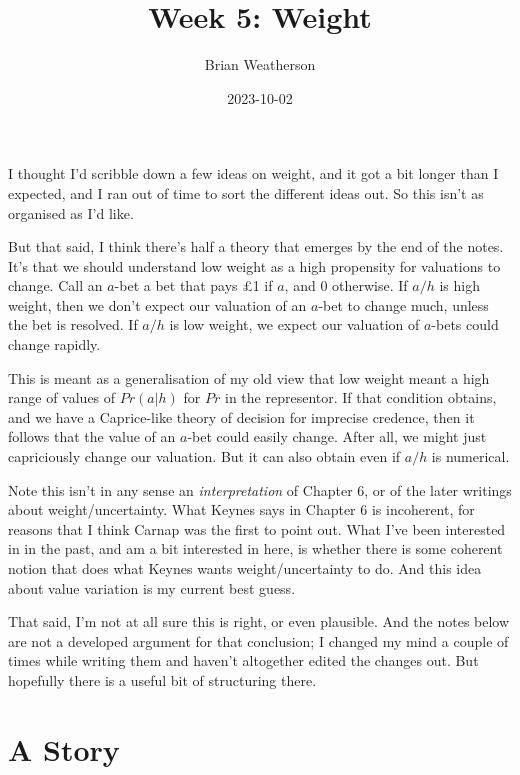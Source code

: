 \documentclass[
  11pt,
  letterpaper,
  DIV=11,
  numbers=noendperiod,
  oneside]{scrartcl}
\title{Week 5: Weight}
\author{Brian Weatherson}
\date{2023-10-02}
\begin{document}
\maketitle
I thought I'd scribble down a few ideas on weight, and it got a bit
longer than I expected, and I ran out of time to sort the different
ideas out. So this isn't as organised as I'd like.

But that said, I think there's half a theory that emerges by the end of
the notes. It's that we should understand low weight as a high
propensity for valuations to change. Call an \(a\)-bet a bet that pays
£1 if \(a\), and 0 otherwise. If \(a/h\) is high weight, then we don't
expect our valuation of an \(a\)-bet to change much, unless the bet is
resolved. If
\(a/h\) is low weight, we expect our valuation of \(a\)-bets could
change rapidly.

This is meant as a generalisation of my old view that low weight meant a
high range of values of \(Pr(a | h)\) for \(Pr\) in the representor. If
that condition obtains, and we have a Caprice-like theory of decision
for imprecise credence, then it follows that the value of an \(a\)-bet
could easily change. After all, we might just capriciously change our
valuation. But it can also obtain even if \(a/h\) is numerical.

Note this isn't in any sense an \emph{interpretation} of Chapter 6, or
of the later writings about weight/uncertainty. What Keynes says in
Chapter 6 is incoherent, for reasons that I think Carnap was the first
to point out. What I've been interested in in the past, and am a bit
interested in here, is whether there is some coherent notion that does
what Keynes wants weight/uncertainty to do. And this idea about value
variation is my current best guess.

That said, I'm not at all sure this is right, or even plausible. And the
notes below are not a developed argument for that conclusion; I changed
my mind a couple of times while writing them and haven't altogether
edited the changes out. But hopefully there is a useful bit of
structuring there.

\section{A Story}\label{a-story}
\end{document}
